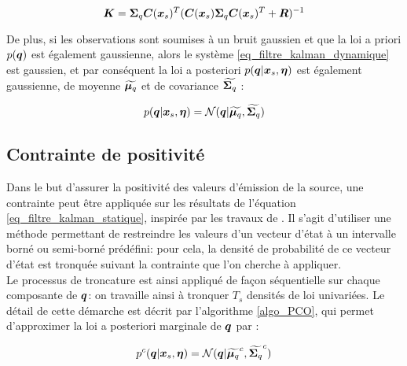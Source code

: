  \begin{equation}
 {\bm{K}} = {\bm{\Sigma}_q}{\bm{C}}({\bm{x}_s})^T({\bm{C}}({\bm{x}_s}){\bm{\Sigma}_q}{\bm{C}}({\bm{x}_s})^T + {\bm{R}})^{-1}
 \end{equation}
 
 
 
 
 
  De plus, si les observations sont soumises à un bruit gaussien et que la loi a priori $p({\bm{q}})$ est également gaussienne, alors le système \eqref{eq_filtre_kalman_dynamique} est gaussien, et par conséquent la loi a posteriori $p({\bm{q}}|{\bm{x}_s}, {\bm{\eta}})$ est également gaussienne, de moyenne ${\widetilde{{\bm{\mu}_q}}}$ et de covariance $ {\widetilde{{\bm{\Sigma}_q}}}$ : 
  
  \begin{equation}
  p({\bm{q}}|{\bm{x}_s}, {\bm{\eta}}) = \mathcal{N}({\bm{q}} | {\widetilde{{\bm{\mu}_q}}}, {\widetilde{{\bm{\Sigma}_q}}})
  \label{eq_AE_13}
  \end{equation}

\subsection{Contrainte de positivité}

Dans le but d'assurer la positivité des valeurs d'émission de la source, une contrainte peut être appliquée sur les résultats de l'équation \eqref{eq_filtre_kalman_statique}, inspirée par les travaux de \cite{Simon2010}. Il s'agit d'utiliser une méthode permettant de restreindre les valeurs d'un vecteur d'état à un intervalle borné ou semi-borné prédéfini: pour cela, la densité de probabilité de ce vecteur d'état est tronquée suivant la contrainte que l'on cherche à appliquer. \\

Le processus de troncature est ainsi appliqué de façon séquentielle sur chaque composante de ${\bm{q}}$: on travaille ainsi à tronquer $T_s$ densités de loi univariées. Le détail de cette démarche est décrit par l'algorithme \ref{algo_PCO}, qui permet d'approximer la loi a posteriori marginale de ${\bm{q}}$ par : 

\begin{equation}
p^c({\bm{q}} | {\bm{x}_s}, {\bm{\eta}}) = \mathcal{N}({\bm{q}} | {\widetilde{{\bm{\mu}_q}}}^c, {\widetilde{{\bm{\Sigma}_q}}}^c)
\label{eq_AE_16}
\end{equation}

